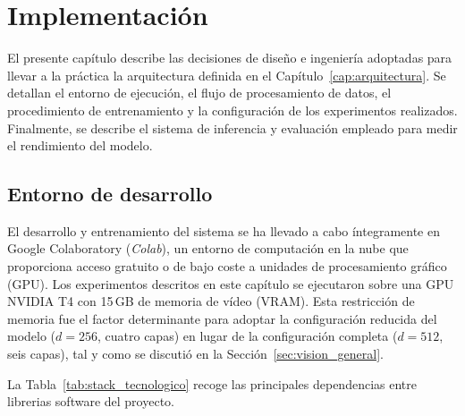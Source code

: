 
\chapter{Implementación}
\label{cap:implementacion}

El presente capítulo describe las decisiones de diseño e ingeniería adoptadas para
llevar a la práctica la arquitectura definida en el
Capítulo~\ref{cap:arquitectura}. Se detallan el entorno de ejecución,
el flujo de procesamiento de datos, el procedimiento de entrenamiento y
la configuración de los experimentos realizados. Finalmente, se describe
el sistema de inferencia y evaluación empleado para medir el rendimiento
del modelo.

\section{Entorno de desarrollo}
\label{sec:entorno}

El desarrollo y entrenamiento del sistema se ha llevado a cabo
íntegramente en Google Colaboratory (\textit{Colab}), un entorno de
computación en la nube que proporciona acceso gratuito o de bajo coste
a unidades de procesamiento gráfico (GPU). Los experimentos descritos en este
capítulo se ejecutaron sobre una GPU NVIDIA T4 con 15\,GB de memoria de
vídeo (VRAM). Esta restricción de memoria fue el factor determinante para
adoptar la configuración reducida del modelo ($d = 256$, cuatro capas)
en lugar de la configuración completa ($d = 512$, seis capas), tal y como
se discutió en la Sección~\ref{sec:vision_general}.

La Tabla~\ref{tab:stack_tecnologico} recoge las principales dependencias entre librerias software
del proyecto.

